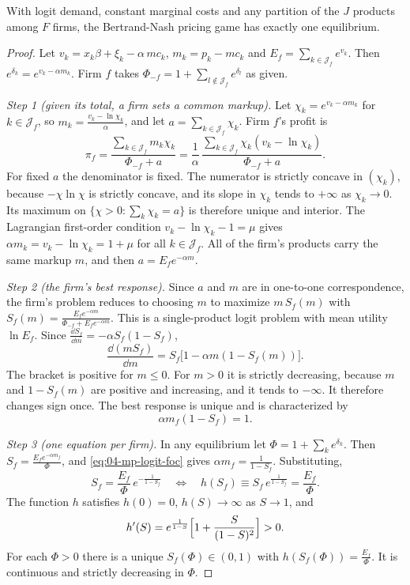 \begin{theorem}\label{thm:04-logit-unique}
With logit demand, constant marginal costs and any partition of the $J$ products among $F$ firms, the
Bertrand-Nash pricing game has exactly one equilibrium.
\end{theorem}

\begin{proof}
Let $v_k = x_k\beta + \xi_k - \alpha\,mc_k$, $m_k = p_k - mc_k$ and $E_f = \sum_{k \in \mathcal{J}_f}e^{v_k}$. Then
$e^{\delta_k} = e^{v_k - \alpha m_k}$. Firm $f$ takes $\Phi_{-f} = 1 + \sum_{l \notin\mathcal{J}_f}e^{\delta_l}$ as given.

\emph{Step 1 (given its total, a firm sets a common markup).} Let $\chi_k = e^{v_k - \alpha m_k}$ for
$k \in \mathcal{J}_f$, so $m_k = \frac{v_k - \ln \chi_k}{\alpha}$, and let $a = \sum_{k \in \mathcal{J}_f}\chi_k$. Firm $f$'s
profit is
\[
  \pi_f = \frac{\sum_{k \in \mathcal{J}_f}m_k \chi_k}{\Phi_{-f} + a} = \frac{1}{\alpha}\,\frac{\sum_{k \in \mathcal{J}_f}\chi_k(v_k - \ln \chi_k)}{\Phi_{-f} + a}.
\]
For fixed $a$ the denominator is fixed. The numerator is strictly concave in $(\chi_k)$, because $-\chi\ln \chi$ is
strictly concave, and its slope in $\chi_k$ tends to $+\infty$ as $\chi_k \to 0$. Its maximum on
$\{\chi > 0 : \sum_k \chi_k = a\}$ is therefore unique and interior. The Lagrangian first-order condition
$v_k - \ln \chi_k - 1 = \mu$ gives $\alpha m_k = v_k - \ln \chi_k = 1 + \mu$ for all $k \in \mathcal{J}_f$. All of the firm's
products carry the same markup $m$, and then $a = E_f e^{-\alpha m}$.

\emph{Step 2 (the firm's best response).} Since $a$ and $m$ are in one-to-one correspondence, the firm's problem
reduces to choosing $m$ to maximize $m\,S_f(m)$ with $S_f(m) = \frac{E_f e^{-\alpha m}}{\Phi_{-f} + E_f e^{-\alpha m}}$.
This is a single-product logit problem with mean utility $\ln E_f$. Since
$\frac{\dd S_f}{\dd m} = -\alpha S_f(1 - S_f)$,
\[
  \frac{\dd (m S_f)}{\dd m} = S_f\bigl[1 - \alpha m(1 - S_f(m))\bigr].
\]
The bracket is positive for $m \le 0$. For $m > 0$ it is strictly decreasing, because $m$ and $1 - S_f(m)$ are
positive and increasing, and it tends to $-\infty$. It therefore changes sign once. The best response is unique and is characterized by
\begin{equation}\label{eq:04-mp-logit-foc}
  \alpha m_f(1 - S_f) = 1.
\end{equation}

\emph{Step 3 (one equation per firm).} In any equilibrium let $\Phi = 1 + \sum_k e^{\delta_k}$. Then
$S_f = \frac{E_f e^{-\alpha m_f}}{\Phi}$, and \eqref{eq:04-mp-logit-foc} gives $\alpha m_f = \frac{1}{1 - S_f}$.
Substituting,
\[
  S_f = \frac{E_f}{\Phi}\,e^{-\frac{1}{1 - S_f}} \quad\Longleftrightarrow\quad h(S_f) \equiv S_f\,e^{\frac{1}{1 - S_f}} = \frac{E_f}{\Phi}.
\]
The function $h$ satisfies $h(0) = 0$, $h(S) \to \infty$ as $S \to 1$, and
\[
  h'(S) = e^{\frac{1}{1 - S}}\Bigl[1 + \frac{S}{(1 - S)^2}\Bigr] > 0.
\]
For each $\Phi > 0$ there is a unique $S_f(\Phi) \in (0,1)$ with $h(S_f(\Phi)) = \frac{E_f}{\Phi}$. It is continuous
and strictly decreasing in $\Phi$.


\end{proof}
